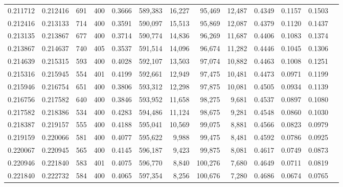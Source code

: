 \begin{tabular}{rrrrrrrrrrrrr}
0.211712 & 0.212416 &   691 & 400 &                                     0.3666 & 589,383 &  16,227 &  95,469 &  12,487 & 0.4349 & 0.1157 & 0.1503 \\
0.212416 & 0.213133 &   714 & 400 &                                     0.3591 & 590,097 &  15,513 &  95,869 &  12,087 & 0.4379 & 0.1120 & 0.1437 \\
0.213135 & 0.213867 &   677 & 400 &                                     0.3714 & 590,774 &  14,836 &  96,269 &  11,687 & 0.4406 & 0.1083 & 0.1374 \\
0.213867 & 0.214637 &   740 & 405 &                                     0.3537 & 591,514 &  14,096 &  96,674 &  11,282 & 0.4446 & 0.1045 & 0.1306 \\
0.214639 & 0.215315 &   593 & 400 &                                     0.4028 & 592,107 &  13,503 &  97,074 &  10,882 & 0.4463 & 0.1008 & 0.1251 \\
0.215316 & 0.215945 &   554 & 401 &                                     0.4199 & 592,661 &  12,949 &  97,475 &  10,481 & 0.4473 & 0.0971 & 0.1199 \\
0.215946 & 0.216754 &   651 & 400 &                                     0.3806 & 593,312 &  12,298 &  97,875 &  10,081 & 0.4505 & 0.0934 & 0.1139 \\
0.216756 & 0.217582 &   640 & 400 &                                     0.3846 & 593,952 &  11,658 &  98,275 &   9,681 & 0.4537 & 0.0897 & 0.1080 \\
0.217582 & 0.218386 &   534 & 400 &                                     0.4283 & 594,486 &  11,124 &  98,675 &   9,281 & 0.4548 & 0.0860 & 0.1030 \\
0.218387 & 0.219157 &   555 & 400 &                                     0.4188 & 595,041 &  10,569 &  99,075 &   8,881 & 0.4566 & 0.0823 & 0.0979 \\
0.219159 & 0.220066 &   581 & 400 &                                     0.4077 & 595,622 &   9,988 &  99,475 &   8,481 & 0.4592 & 0.0786 & 0.0925 \\
0.220067 & 0.220945 &   565 & 400 &                                     0.4145 & 596,187 &   9,423 &  99,875 &   8,081 & 0.4617 & 0.0749 & 0.0873 \\
0.220946 & 0.221840 &   583 & 401 &                                     0.4075 & 596,770 &   8,840 & 100,276 &   7,680 & 0.4649 & 0.0711 & 0.0819 \\
0.221840 & 0.222732 &   584 & 400 &                                     0.4065 & 597,354 &   8,256 & 100,676 &   7,280 & 0.4686 & 0.0674 & 0.0765 \\

\end{tabular}
